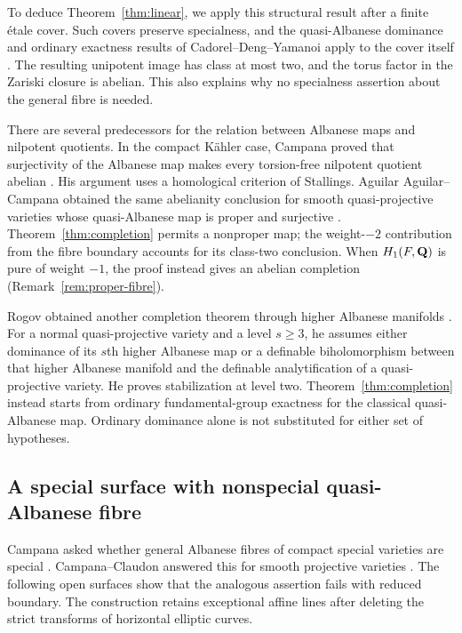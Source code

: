 To deduce Theorem~\ref{thm:linear}, we apply this structural result after
a finite \'etale cover. Such covers preserve specialness, and the
quasi-Albanese dominance and ordinary exactness results of
Cadorel--Deng--Yamanoi apply to the cover itself
\cite[Theorem 3.1, Lemma 4.4 and Proposition 4.13]{CDY2025}.
The resulting unipotent image has class at most two, and the torus
factor in the Zariski closure is abelian. This also explains why no
specialness assertion about the general fibre is needed.

There are several predecessors for the relation between Albanese maps
and nilpotent quotients. In the compact K\"ahler case, Campana proved
that surjectivity of the Albanese map makes every torsion-free
nilpotent quotient abelian \cite[Corollary 3.1]{Campana1995}.
His argument uses a homological criterion of Stallings. Aguilar
Aguilar--Campana obtained the same abelianity conclusion for smooth
quasi-projective varieties whose quasi-Albanese map is proper and
surjective \cite[arXiv version, Corollary 2(2)]
{AguilarAguilarCampana2025}. Theorem~\ref{thm:completion} permits a
nonproper map; the weight-$-2$ contribution from the fibre boundary
accounts for its class-two conclusion. When $H_1(F,\mathbf Q)$ is pure of
weight $-1$, the proof instead gives an abelian completion
(Remark~\ref{rem:proper-fibre}).

Rogov obtained another completion theorem through higher Albanese
manifolds \cite[Theorem B, equivalently Theorem 7.9 and Corollary 7.10]
{RogovHigher2026}. For a normal quasi-projective variety and a level
$s\geq3$, he assumes either dominance of its $s$th higher Albanese map
or a definable biholomorphism between that higher Albanese manifold and
the definable analytification of a quasi-projective variety. He proves
stabilization at level two. Theorem~\ref{thm:completion} instead starts
from ordinary fundamental-group exactness for the classical
quasi-Albanese map. Ordinary dominance alone is not substituted for
either set of hypotheses.

\subsection{A special surface with nonspecial quasi-Albanese fibre}
Campana asked whether general Albanese fibres of compact special
varieties are special \cite[Question 5.4, p.~577]{Campana2004}.
Campana--Claudon answered this for smooth projective varieties
\cite[Theorem 2.4]{CampanaClaudon2016}. The following open surfaces
show that the analogous assertion fails with reduced boundary. The
construction retains exceptional affine lines after deleting the
strict transforms of horizontal elliptic curves.

